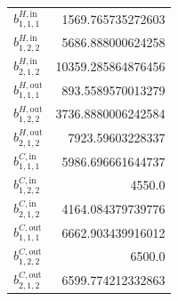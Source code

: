 \documentclass{article}%
\begin{document}
\begin{multicols*}{3}
\begin{supertabular}{lr}
	$b_{1,1,1}^{H,\text{in}}$ & 1569.765735272603 \\%
	$b_{1,2,2}^{H,\text{in}}$ & 5686.888000624258 \\%
	$b_{2,1,2}^{H,\text{in}}$ & 10359.285864876456 \\%
	$b_{1,1,1}^{H,\text{out}}$ & 893.5589570013279 \\%
	$b_{1,2,2}^{H,\text{out}}$ & 3736.8880006242584 \\%
	$b_{2,1,2}^{H,\text{out}}$ & 7923.59603228337 \\%
	$b_{1,1,1}^{C,\text{in}}$ & 5986.696661644737 \\%
	$b_{1,2,2}^{C,\text{in}}$ & 4550.0 \\%
	$b_{2,1,2}^{C,\text{in}}$ & 4164.084379739776 \\%
	$b_{1,1,1}^{C,\text{out}}$ & 6662.903439916012 \\%
	$b_{1,2,2}^{C,\text{out}}$ & 6500.0 \\%
	$b_{2,1,2}^{C,\text{out}}$ & 6599.774212332863 \\%
\end{supertabular}%
\end{multicols*}%
\clearpage%
\end{document}
